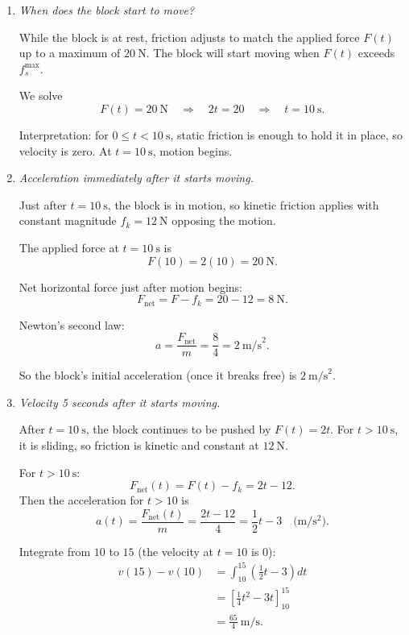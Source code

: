 \documentclass[12pt]{article}
\begin{document}
\begin{enumerate}
\begin{enumerate}
    \item \textit{When does the block start to move?}

    While the block is at rest, friction adjusts to match the applied force $F(t)$ up to a maximum of $20~\text{N}$. The block will start moving when $F(t)$ exceeds $f_s^{\max}$.

    We solve
    \[
    F(t) = 20~\text{N}
    \quad\Rightarrow\quad
    2t = 20
    \quad\Rightarrow\quad
    t = 10~\text{s}.
    \]

    Interpretation: for $0 \le t < 10~\text{s}$, static friction is enough to hold it in place, so velocity is zero. At $t=10~\text{s}$, motion begins.

    \item \textit{Acceleration immediately after it starts moving.}

    Just after $t = 10~\text{s}$, the block is in motion, so kinetic friction applies with constant magnitude $f_k = 12~\text{N}$ opposing the motion.

    The applied force at $t=10~\text{s}$ is
    \[
    F(10) = 2(10) = 20~\text{N}.
    \]

    Net horizontal force just after motion begins:
    \[
    F_{\text{net}} = F - f_k = 20 - 12 = 8~\text{N}.
    \]

    Newton's second law:
    \[
    a = \frac{F_{\text{net}}}{m}
    = \frac{8}{4}
    = 2~\text{m/s}^2.
    \]

    So the block's initial acceleration (once it breaks free) is $2~\text{m/s}^2$.

    \item \textit{Velocity 5 seconds after it starts moving.}

    After $t=10~\text{s}$, the block continues to be pushed by $F(t)=2t$. For $t>10~\text{s}$, it is sliding, so friction is kinetic and constant at $12~\text{N}$.

    For $t>10~\text{s}$:
    \[
    F_{\text{net}}(t) = F(t) - f_k = 2t - 12.
    \]
    Then the acceleration for $t>10$ is
    \[
    a(t) = \frac{F_{\text{net}}(t)}{m}
    = \frac{2t - 12}{4}
    = \frac{1}{2}t - 3
    \quad \text{(m/s$^2$)}.
    \]

    
    Integrate from $10$ to $15$ (the velocity at $t=10$ is $0$):
    \begin{align*}
    v(15) - v(10)
    &= \int_{10}^{15} \left( \frac{1}{2}t - 3 \right) dt \\
    &= \left[ \frac{1}{4}t^2 -3t \right]_{10}^{15} \\
    &= \frac{65}{4}~\text{m/s}.
    \end{align*}
\end{enumerate}

\end{enumerate}
\end{document}
